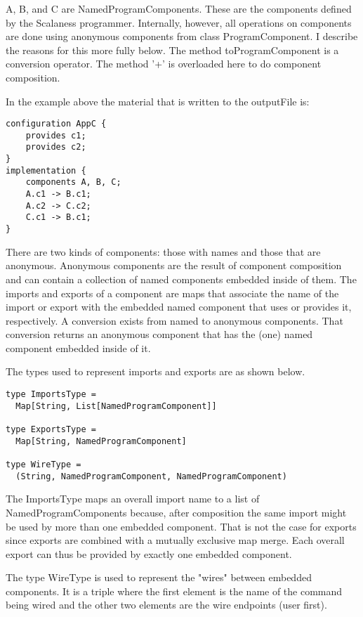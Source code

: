A, B, and C are NamedProgramComponents. These are the components defined by the Scalaness
programmer. Internally, however, all operations on components are done using anonymous
components from class ProgramComponent. I describe the reasons for this more fully below. The
method toProgramComponent is a conversion operator. The method '+' is overloaded here to do
component composition.

In the example above the material that is written to the outputFile is:

\singlespace
\begin{Verbatim}
configuration AppC {
    provides c1;
    provides c2;
}
implementation {
    components A, B, C;
    A.c1 -> B.c1;
    A.c2 -> C.c2;
    C.c1 -> B.c1;
}
\end{Verbatim}
\primaryspacing

There are two kinds of components: those with names and those that are anonymous. Anonymous
components are the result of component composition and can contain a collection of named
components embedded inside of them. The imports and exports of a component are maps that
associate the name of the import or export with the embedded named component that uses or
provides it, respectively. A conversion exists from named to anonymous components. That
conversion returns an anonymous component that has the (one) named component embedded inside of
it.

The types used to represent imports and exports are as shown below.

\singlespace
\begin{lstlisting}
type ImportsType =
  Map[String, List[NamedProgramComponent]]

type ExportsType =
  Map[String, NamedProgramComponent]

type WireType =
  (String, NamedProgramComponent, NamedProgramComponent)
\end{lstlisting}
\primaryspacing

The ImportsType maps an overall import name to a list of NamedProgramComponents because, after
composition the same import might be used by more than one embedded component. That is not the
case for exports since exports are combined with a mutually exclusive map merge. Each overall
export can thus be provided by exactly one embedded component.

The type WireType is used to represent the "wires" between embedded components. It is a triple
where the first element is the name of the command being wired and the other two elements are
the wire endpoints (user first).

